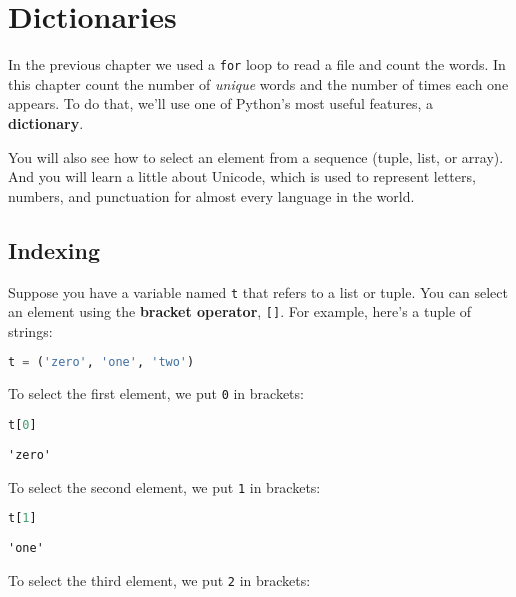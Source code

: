 \hypertarget{dictionaries}{%
\chapter{Dictionaries}\label{dictionaries}}

In the previous chapter we used a \passthrough{\lstinline!for!} loop to
read a file and count the words. In this chapter count the number of
\emph{unique} words and the number of times each one appears. To do
that, we'll use one of Python's most useful features, a
\textbf{dictionary}.

You will also see how to select an element from a sequence (tuple, list,
or array). And you will learn a little about Unicode, which is used to
represent letters, numbers, and punctuation for almost every language in
the world.

\hypertarget{indexing}{%
\section{Indexing}\label{indexing}}

Suppose you have a variable named \passthrough{\lstinline!t!} that
refers to a list or tuple. You can select an element using the
\textbf{bracket operator}, \passthrough{\lstinline![]!}. For example,
here's a tuple of strings:

\begin{lstlisting}[language=Python,style=source]
t = ('zero', 'one', 'two')
\end{lstlisting}

To select the first element, we put \passthrough{\lstinline!0!} in
brackets:

\begin{lstlisting}[language=Python,style=source]
t[0]
\end{lstlisting}

\begin{lstlisting}[style=output]
'zero'
\end{lstlisting}

To select the second element, we put \passthrough{\lstinline!1!} in
brackets:

\begin{lstlisting}[language=Python,style=source]
t[1]
\end{lstlisting}

\begin{lstlisting}[style=output]
'one'
\end{lstlisting}

To select the third element, we put \passthrough{\lstinline!2!} in
brackets:

